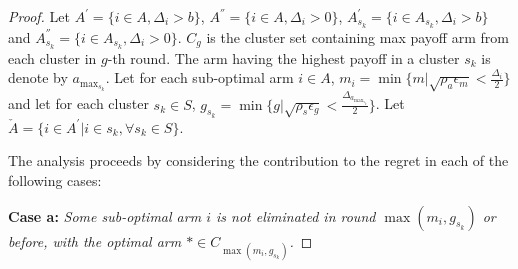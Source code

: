 \begin{proof}

Let $A^{'}=\lbrace i \in A,\Delta_{i}> b\rbrace$,  $A^{''}=\lbrace i \in A, \Delta_{i} > 0\rbrace$, $A^{'}_{s_{k}}=\lbrace i \in A_{s_{k}},\Delta_{i}> b\rbrace$ and $A^{''}_{s_{k}}=\lbrace i \in A_{s_{k}}, \Delta_{i} > 0 \rbrace$. $C_{g}$ is the cluster set containing max payoff arm from each cluster in $g$-th round. The arm having the highest payoff in a cluster $s_{k}$ is denote by $a_{\max_{s_{k}}}$. Let for each sub-optimal arm ${i}\in A$, $m_{i}=\min{\lbrace m|\sqrt{\rho_{a}\epsilon_{m}} < \frac{\Delta_{i}}{2} \rbrace}$ and let for each cluster $s_{k}\in S$, $g_{s_{k}}=\min{\lbrace g|\sqrt{\rho_{s}\epsilon_{g}} < \frac{\Delta_{a_{\max_{s_{k}}}}}{2} \rbrace}$. 
Let $\check{A}=\lbrace {i}\in A^{'} | {i}\in s_{k} , \forall s_{k}\in S \rbrace$.

The analysis proceeds by considering the contribution to the regret in each of the following cases:

\textbf{Case a:} \textit{Some sub-optimal arm ${i}$ is not eliminated in round $\max(m_{i},g_{s_{k}})$ or before, with the optimal arm ${*}\in C_{\max(m_{i},g_{s_{k}})}$.}


\end{proof}
